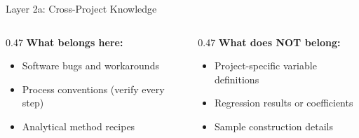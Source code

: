 \documentclass[aspectratio=169,11pt]{beamer}
\begin{document}
\begin{frame}[shrink=5]{Layer 2a: Cross-Project Knowledge}
\begin{columns}[T]
\begin{column}{0.47\textwidth}
\small\textcolor{cGreen}{\textbf{What belongs here:}}
\begin{itemize}\footnotesize
  \item Software bugs and workarounds
  \item Process conventions (verify every step)
  \item Analytical method recipes
\end{itemize}
\end{column}
\begin{column}{0.47\textwidth}
\small\textcolor{cRed}{\textbf{What does NOT belong:}}
\begin{itemize}\footnotesize
  \item Project-specific variable definitions
  \item Regression results or coefficients
  \item Sample construction details
\end{itemize}
\end{column}
\end{columns}

\end{frame}
\end{document}
